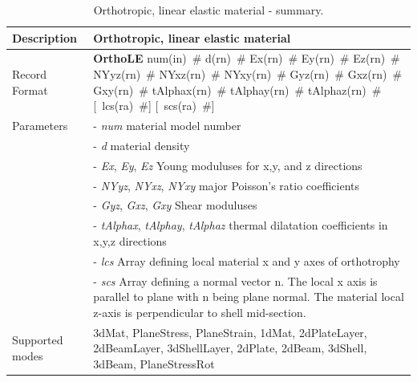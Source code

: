 \documentclass[epsf,a4paper]{article}
\newcommand{\descitem}[1]{{\noindent \bf #1}}
\newcommand{\elemparam}[2]{{{#1\tiny (#2)}~\#}}
\newcommand{\optelemparam}[2]{[{~\elemparam{#1}{#2}}]}
\newcommand{\param}[1]{{\it #1}}
\begin{document}
\begin{table}[h]                                                                
\begin{tabular}{|l|p{9cm}|}                                                      
\hline                                                                          
Description & Orthotropic, linear elastic material\\
\hline                                                                          
Record Format & \descitem{OrthoLE} \elemparam{num}{in}
\elemparam{d}{rn} \elemparam{Ex}{rn} \elemparam{Ey}{rn}
\elemparam{Ez}{rn} \elemparam{NYyz}{rn} \elemparam{NYxz}{rn} \elemparam{NYxy}{rn} 
\elemparam{Gyz}{rn} \elemparam{Gxz}{rn} \elemparam{Gxy}{rn}
\elemparam{tAlphax}{rn} \elemparam{tAlphay}{rn}
\elemparam{tAlphaz}{rn} \optelemparam{lcs}{ra} \optelemparam{scs}{ra}\\
Parameters &- \param{num} material model number\\
&- \param{d} material density\\
&- \param{Ex}, \param{Ey}, \param{Ez} Young moduluses for x,y, and z directions\\
&- \param{NYyz}, \param{NYxz}, \param{NYxy} major Poisson's ratio
coefficients\\
&- \param{Gyz}, \param{Gxz}, \param{Gxy} Shear moduluses \\
&- \param{tAlphax}, \param{tAlphay}, \param{tAlphaz} thermal
dilatation coefficients in x,y,z directions\\
&- \param{lcs} Array defining local material x and y axes of orthotrophy\\
&- \param{scs} Array defining a normal vector n. The local x axis is
parallel to plane with n being plane normal. The material local z-axis
is perpendicular to shell mid-section.\\
Supported modes& 3dMat, PlaneStress, PlaneStrain, 1dMat,
2dPlateLayer, 2dBeamLayer, 3dShellLayer, 2dPlate, 2dBeam, 3dShell,
3dBeam, PlaneStressRot\\
\hline
\end{tabular}                                                                   
\caption{Orthotropic, linear elastic material - summary.}                
\label{OrthoLE_table}                                                         
\end{table}                                                                     
\end{document}
